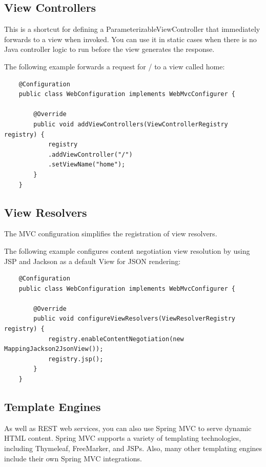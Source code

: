 \documentclass{scrartcl}
\begin{document}
\subsection{View Controllers}

This is a shortcut for defining a ParameterizableViewController that immediately forwards to a view when invoked. You can use it in static cases when there is no Java controller logic to run before the view generates the response.

The following example forwards a request for / to a view called home:

\begin{lstlisting}
    @Configuration
    public class WebConfiguration implements WebMvcConfigurer {

        @Override
        public void addViewControllers(ViewControllerRegistry registry) {
            registry
            .addViewController("/")
            .setViewName("home");
        }
    }
\end{lstlisting}

\subsection{View Resolvers}

The MVC configuration simplifies the registration of view resolvers.

The following example configures content negotiation view resolution by using JSP and Jackson as a default View for JSON rendering:

\begin{lstlisting}
    @Configuration
    public class WebConfiguration implements WebMvcConfigurer {

        @Override
        public void configureViewResolvers(ViewResolverRegistry registry) {
            registry.enableContentNegotiation(new MappingJackson2JsonView());
            registry.jsp();
        }
    }
\end{lstlisting}

\subsection{Template Engines}

As well as REST web services, you can also use Spring MVC to serve dynamic HTML content. Spring MVC supports a variety of templating technologies, including Thymeleaf, FreeMarker, and JSPs. Also, many other templating engines include their own Spring MVC integrations.
\end{document}
